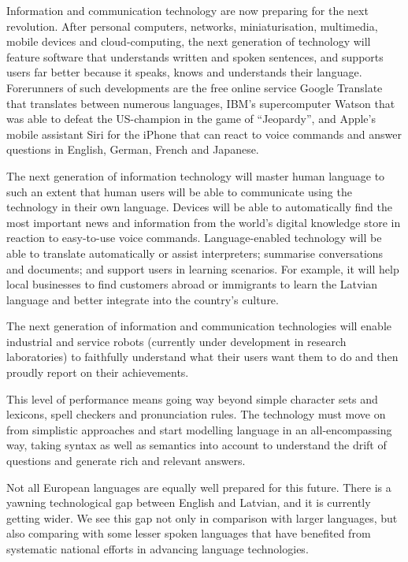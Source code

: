 \begin{multicols}{2}
Information and communication technology are now preparing for the next revolution.
After personal computers, networks, miniaturisation, multimedia, mobile devices and cloud-computing, the next generation of technology will feature software that understands written and spoken sentences, and supports users far better because it speaks, knows and understands their language.
Forerunners of such developments are the free online service Google Translate that translates between numerous languages, IBM’s supercomputer Watson that was able to defeat the US-champion in the game of “Jeopardy”, and Apple’s mobile assistant Siri for the iPhone that can react to voice commands and answer questions in English, German, French and Japanese. 

The next generation of information technology will master human language to such an extent that human users will be able to communicate using the technology in their own language.
Devices will be able to automatically find the most important news and information from the world’s digital knowledge store in reaction to easy-to-use voice commands.
Language-enabled technology will be able to translate automatically or assist interpreters; summarise conversations and documents; and support users in learning scenarios.
For example, it will help local businesses to find customers abroad or immigrants to learn the Latvian language and better integrate into the country’s culture.

The next generation of information and communication technologies will enable industrial and service robots (currently under development in research laboratories) to faithfully understand what their users want them to do and then proudly report on their achievements.  

This level of performance means going way beyond simple character sets and lexicons, spell checkers and pronunciation rules.
The technology must move on from simplistic approaches and start modelling language in an all-encompassing way, taking syntax as well as semantics into account to understand the drift of questions and generate rich and relevant answers.

Not all European languages are equally well prepared for this future.
There is a yawning technological gap between English and Latvian, and it is currently getting wider.
We see this gap not only in comparison with larger languages, but also comparing with some lesser spoken languages that have benefited from systematic national efforts in advancing language technologies. 


\end{multicols}
